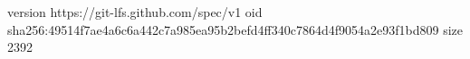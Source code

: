version https://git-lfs.github.com/spec/v1
oid sha256:49514f7ae4a6c6a442c7a985ea95b2befd4ff340c7864d4f9054a2e93f1bd809
size 2392

